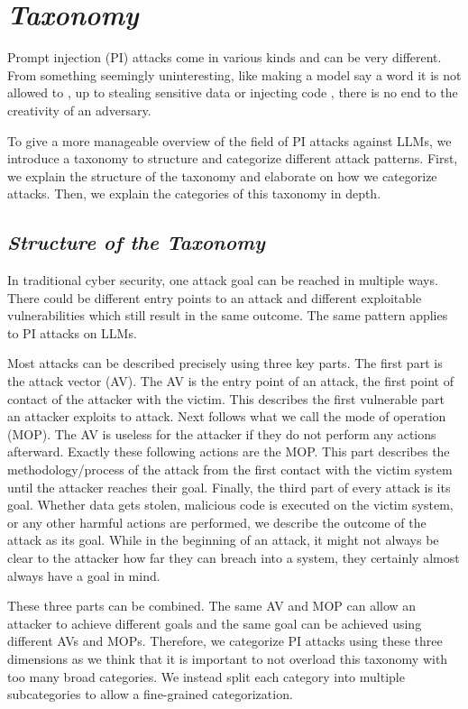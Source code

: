 \section{\textit{Taxonomy}}
\label{taxonomy}
Prompt injection (PI) attacks come in various kinds and can be very different.
From something seemingly uninteresting, like making a model say a word it is not allowed to \cite{chao2023jailbreaking}, up to stealing sensitive data or injecting code \cite{10.1145/3605764.3623985}, there is no end to the creativity of an adversary. 

To give a more manageable overview of the field of PI attacks against LLMs, we introduce a taxonomy to structure and categorize different attack patterns.
First, we explain the structure of the taxonomy and elaborate on how we categorize attacks. Then, we explain the categories of this taxonomy in depth.

\subsection{\textit{Structure of the Taxonomy}}
In traditional cyber security, one attack goal can be reached in multiple ways. 
There could be different entry points to an attack and different exploitable vulnerabilities which still result in the same outcome. 
The same pattern applies to PI attacks on LLMs.

Most attacks can be described precisely using three key parts. 
The first part is the attack vector (AV).
The AV is the entry point of an attack, the first point of contact of the attacker with the victim.
This describes the first vulnerable part an attacker exploits to attack.
Next follows what we call the mode of operation (MOP). 
The AV is useless for the attacker if they do not perform any actions afterward. Exactly these following actions are the MOP.
This part describes the methodology/process of the attack from the first contact with the victim system until the attacker reaches their goal. 
Finally, the third part of every attack is its goal. 
Whether data gets stolen, malicious code is executed on the victim system, or any other harmful actions are performed, we describe the outcome of the attack as its goal.
While in the beginning of an attack, it might not always be clear to the attacker how far they can breach into a system, they certainly almost always have a goal in mind.

These three parts can be combined. 
The same AV and MOP can allow an attacker to achieve different goals and the same goal can be achieved using different AVs and MOPs. 
Therefore, we categorize PI attacks using these three dimensions as we think that it is important to not overload this taxonomy with too many broad categories.  
We instead split each category into multiple subcategories to allow a fine-grained categorization. 

